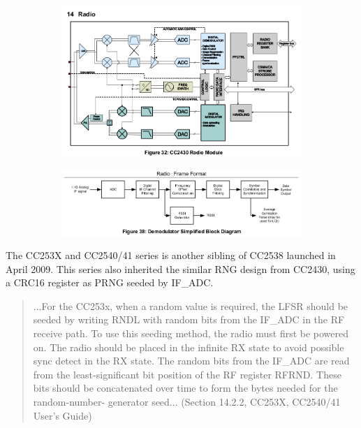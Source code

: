 \begin{figure}[ht!]
\center
\caption{Radio and Demodulator of CC2430 from CC2430 User's Guide}
\begin{subfigure}{\linewidth}
	\includegraphics[width=\linewidth]{./figures/CC2430_Radio.png}
\end{subfigure}

\begin{subfigure}{\linewidth}
	\includegraphics[width=\linewidth]{./figures/CC2430_Demodulator.png}
\end{subfigure}
\label{CC2430_RF}
\end{figure}

The CC253X and CC2540/41 series\cite{CC253X_Manual} is another sibling of CC2538 launched in April 2009. This series also inherited the similar RNG design from CC2430, using a CRC16 register as PRNG seeded by IF\_ADC.

\begin{quote}
...For the CC253x, when a random value is required, the LFSR should be seeded by writing RNDL with random bits from the IF\_ADC in the RF receive path. To use this seeding method, the radio must first be powered on. The radio should be placed in the infinite RX state to avoid possible sync detect in the RX state. The random bits from the IF\_ADC are read from the least-significant bit position of the RF register RFRND. These bits should be concatenated over time to form the bytes needed for the random-number-
generator seed... (Section 14.2.2, CC253X, CC2540/41 User's Guide)
\end{quote}

